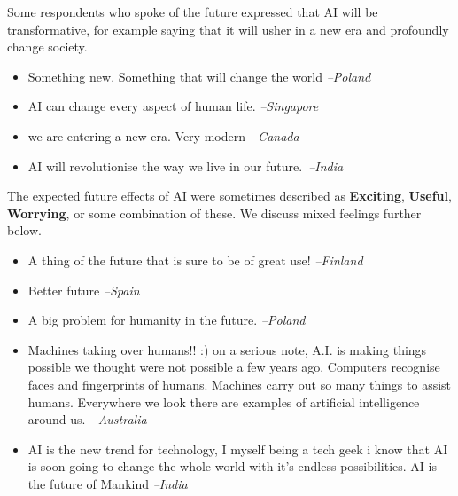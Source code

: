 \documentclass[11pt]{article} %
\newcommand\aff[1]{\textcolor{darkplum}{{\emph{--#1}}}}
\newenvironment{lq2}
{ \vspace{-3pt}
  \begin{itemize}[leftmargin = 4.0em, rightmargin=5.0em, label={}]
    \fontsize{10pt}{10.7pt}\selectfont
    \setlength{\itemsep}{3pt}
    \setlength{\parskip}{2.5pt}
    \setlength{\parsep}{3pt}     }
{ \end{itemize} \vspace{1pt}  }
\def\Exciting/{{\fontfamily{lmss}\selectfont\textbf{Exciting}}}  \def\Useful/{{\fontfamily{lmss}\selectfont\textbf{Useful}}}
\def\Worrying/{{\fontfamily{lmss}\selectfont\textbf{Worrying}}}
\begin{document}
Some respondents who spoke of the future expressed that AI will be transformative, for example saying that it will usher in a new era and profoundly change society.
\begin{lq2}
\item Something new. Something that will change the world \aff{Poland}
\item AI can change every aspect of human life. \aff{Singapore}
\item we are entering a new era. Very modern~\aff{Canada}
\item AI will revolutionise the way we live in our future.~\aff{India}
\end{lq2}

The expected future effects of AI were sometimes described as \Exciting/, \Useful/, \Worrying/, or some combination of these. We discuss mixed feelings further below.
\begin{lq2}
\item A thing of the future that is sure to be of great use! \aff{Finland}
\item Better future \aff{Spain}
\item A big problem for humanity in the future. \aff{Poland}
\item Machines taking over humans!! :) on a serious note, A.I. is making things possible we thought were not possible a few years ago. Computers recognise faces and fingerprints of humans. Machines carry out so many things to assist humans. Everywhere we look there are examples of artificial intelligence around us.~\aff{Australia}
\item AI is the new trend for technology, I myself being a tech geek i know that AI is soon going to change the whole world with it's endless possibilities. AI is the future of Mankind \aff{India}
\end{lq2}
\end{document}
